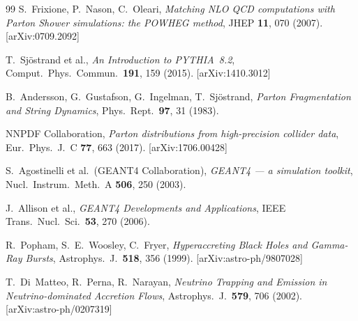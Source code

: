 \documentclass[11pt,a4paper]{article}
\begin{document}
\begin{thebibliography}{99}
S.~Frixione, P.~Nason, C.~Oleari, \textit{Matching NLO QCD computations with Parton Shower simulations: the POWHEG method}, JHEP \textbf{11}, 070 (2007). [arXiv:0709.2092]

T.~Sj\"{o}strand et al., \textit{An Introduction to PYTHIA~8.2}, Comput.\ Phys.\ Commun.\ \textbf{191}, 159 (2015). [arXiv:1410.3012]

B.~Andersson, G.~Gustafson, G.~Ingelman, T.~Sj\"{o}strand, \textit{Parton Fragmentation and String Dynamics}, Phys.\ Rept.\ \textbf{97}, 31 (1983).

NNPDF Collaboration, \textit{Parton distributions from high-precision collider data}, Eur.\ Phys.\ J.\ C \textbf{77}, 663 (2017). [arXiv:1706.00428]

S.~Agostinelli et al.\ (GEANT4 Collaboration), \textit{GEANT4 — a simulation toolkit}, Nucl.\ Instrum.\ Meth.\ A \textbf{506}, 250 (2003).

J.~Allison et al., \textit{GEANT4 Developments and Applications}, IEEE Trans.\ Nucl.\ Sci.\ \textbf{53}, 270 (2006).

R.~Popham, S.~E.~Woosley, C.~Fryer, \textit{Hyperaccreting Black Holes and Gamma-Ray Bursts}, Astrophys.\ J.\ \textbf{518}, 356 (1999). [arXiv:astro-ph/9807028]

T.~Di~Matteo, R.~Perna, R.~Narayan, \textit{Neutrino Trapping and Emission in Neutrino-dominated Accretion Flows}, Astrophys.\ J.\ \textbf{579}, 706 (2002). [arXiv:astro-ph/0207319]

\end{thebibliography}
\end{document}
